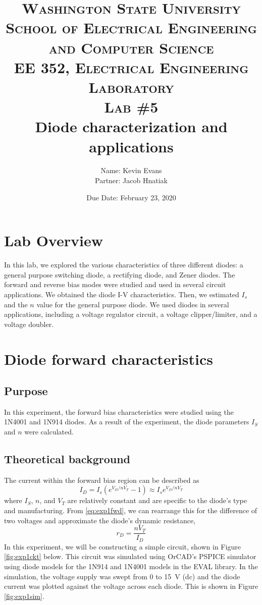 \documentclass{report}
\title{
	\textsc{ \small
		Washington State University \\
		School of Electrical Engineering and Computer Science \\
		EE 352, Electrical Engineering Laboratory
	} \\
	{\textsc{\small Lab \#5}} \\
	Diode characterization and applications
}
\author{
	Name: Kevin Evans \\
	Partner: Jacob Hnatiak
}
\date{Due Date: February 23, 2020}
\begin{document}
\maketitle

\section*{Lab Overview}
In this lab, we explored the various characteristics of three different diodes: a general purpose switching diode, a rectifying diode, and Zener diodes. The forward and reverse bias modes were studied and used in several circuit applications. We obtained the diode I-V characteristics. Then, we estimated $I_s$ and the $n$ value for the general purpose diode. We used diodes in several applications, including a voltage regulator circuit, a voltage clipper/limiter, and a voltage doubler.

\section{Diode forward characteristics}

\subsection{Purpose}
In this experiment, the forward bias characteristics were studied using the 1N4001 and 1N914 diodes. As a result of the experiment, the diode parameters $I_S$ and $n$ were calculated.

\subsection{Theoretical background}
The current within the forward bias region can be described as \begin{equation}
	I_D = I_s \left( e^{V_D / n V_T} - 1\right) \approx I_s e^{{V_D}/{nV_T}} \label{eq:exp1fwd}
\end{equation}
where $I_S$, $n$, and $V_T$ are relatively constant and are specific to the diode's type and manufacturing. From \eqref{eq:exp1fwd}, we can rearrange this for the difference of two voltages and approximate the diode's dynamic resistance,
\begin{equation}
	r_D = \frac{ n V_T }{I_D}
\end{equation}
In this experiment, we will be constructing a simple circuit, shown in Figure \ref{fig:exp1ckt} below. This circuit was simulated using OrCAD's PSPICE simulator using diode models for the 1N914 and 1N4001 models in the EVAL library. In the simulation, the voltage supply was swept from \num{0} to \SI{15}{\V} (dc) and the diode current was plotted against the voltage across each diode. This is shown in Figure \ref{fig:exp1sim}.
\end{document}
